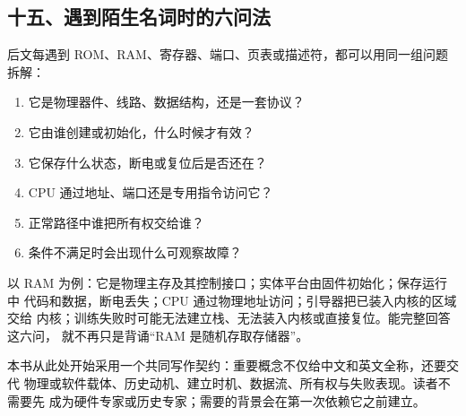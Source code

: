 \subsection{十五、遇到陌生名词时的六问法}

后文每遇到 ROM、RAM、寄存器、端口、页表或描述符，都可以用同一组问题拆解：

\begin{enumerate}[leftmargin=2em]
  \item 它是物理器件、线路、数据结构，还是一套协议？
  \item 它由谁创建或初始化，什么时候才有效？
  \item 它保存什么状态，断电或复位后是否还在？
  \item CPU 通过地址、端口还是专用指令访问它？
  \item 正常路径中谁把所有权交给谁？
  \item 条件不满足时会出现什么可观察故障？
\end{enumerate}

以 RAM 为例：它是物理主存及其控制接口；实体平台由固件初始化；保存运行中
代码和数据，断电丢失；CPU 通过物理地址访问；引导器把已装入内核的区域交给
内核；训练失败时可能无法建立栈、无法装入内核或直接复位。能完整回答这六问，
就不再只是背诵“RAM 是随机存取存储器”。

\begin{contractbox}
本书从此处开始采用一个共同写作契约：重要概念不仅给中文和英文全称，还要交代
物理或软件载体、历史动机、建立时机、数据流、所有权与失败表现。读者不需要先
成为硬件专家或历史专家；需要的背景会在第一次依赖它之前建立。
\end{contractbox}
